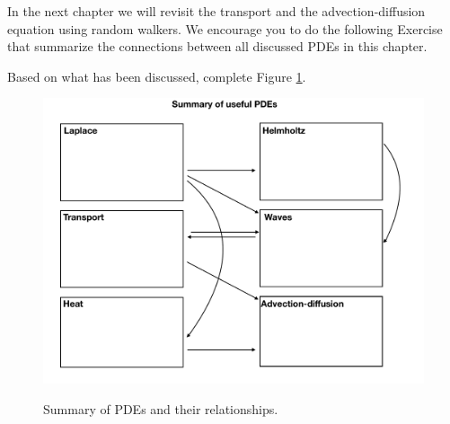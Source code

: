 In the next chapter we will revisit the transport and the advection-diffusion equation using random walkers. We encourage you to do the following Exercise that summarize the connections between all discussed PDEs in this chapter.
 \begin{Exercise} 
Based on what has been discussed, complete Figure \ref{fig:pde}.
 \begin{figure}[h]
  \centering
  \includegraphics[width=0.9\linewidth]{img/pdes_summary.pdf}\\
  \caption{Summary of PDEs and their relationships.}
  \label{fig:pde}
 \end{figure}
 \end{Exercise}